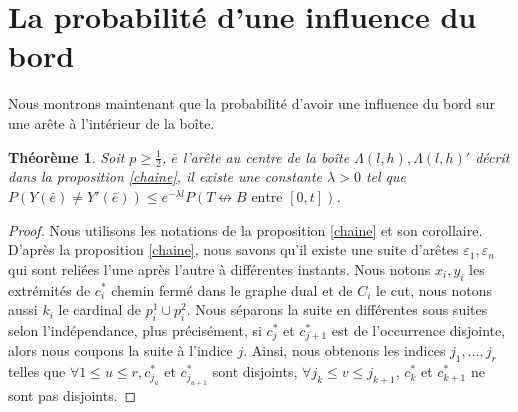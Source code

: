 \documentclass[titlepage,a4paper,12pt]{article}
\newcounter{thm}
\newcounter{prop}
\newcounter{cor}
\newtheorem{cvg}[thm]{Théorème}
\begin{document}
\section{La probabilité d'une influence du bord}

Nous montrons maintenant que la probabilité d'avoir une influence du bord sur une arête à l'intérieur de la boîte. 
\begin{cvg}
Soit $p\geqslant \frac{1}{2}$, $\bar{e}$ l'arête au centre de la boîte $\Lambda(l,h), \Lambda(l,h)'$ décrit dans la proposition \ref{chaine}, il existe une constante $\lambda> 0$ tel que $P(Y(\bar{e})\neq Y'(\bar{e})) \leqslant e^{-\lambda l} P(T\nleftrightarrow B \text{ entre }[0,t])$.
\end{cvg}

\begin{proof}

Nous utilisons les notations de la proposition \ref{chaine} et son corollaire.
D'après la proposition \ref{chaine}, nous savons qu'il existe une suite d'arêtes $\varepsilon_1,\varepsilon_n$ qui sont reliées l'une après l'autre à différentes instants. Nous notons $x_i,y_i$ les extrémités de $c_i^*$ chemin fermé dans le graphe dual et de $C_i$ le cut, nous notons aussi $k_i$ le cardinal de $p_i^1\cup p_i^2$. Nous séparons la suite en différentes sous suites selon l'indépendance, plus précisément, si $c^*_j$ et $c^*_{j+1}$  est de l'occurrence disjointe, alors nous coupons la suite à l'indice $j$. Ainsi, nous obtenons les indices $j_1,\dots,j_r$ telles que $\forall 1\leqslant u\leqslant r, c^*_{j_u}$ et $c^*_{j_{u+1}}$ sont disjoints, $\forall j_k \leqslant v \leqslant j_{k+1}$, $c_k^*$ et $c_{k+1}^*$ ne sont pas disjoints.


\end{proof}
\end{document}
